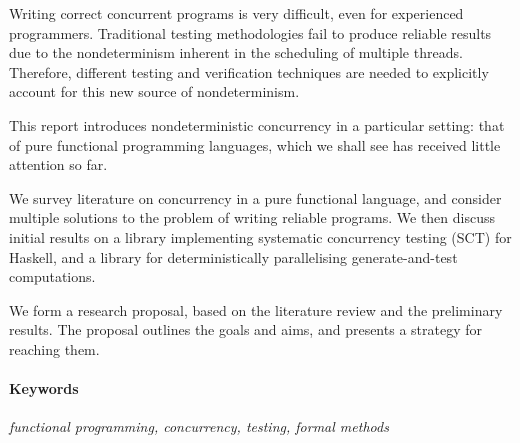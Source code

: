 
Writing correct concurrent programs is very difficult, even for
experienced programmers. Traditional testing methodologies fail to
produce reliable results due to the nondeterminism inherent in the
scheduling of multiple threads. Therefore, different testing and
verification techniques are needed to explicitly account for this new
source of nondeterminism.

This report introduces nondeterministic concurrency in a particular
setting: that of pure functional programming languages, which we shall
see has received little attention so far.

We survey literature on concurrency in a pure functional language, and
consider multiple solutions to the problem of writing reliable
programs. We then discuss initial results on a library implementing
systematic concurrency testing (SCT) for Haskell, and a library for
deterministically parallelising generate-and-test computations.

We form a research proposal, based on the literature review and the
preliminary results. The proposal outlines the goals and aims, and
presents a strategy for reaching them.

\vfill

\paragraph{Keywords}

\textit{functional programming, concurrency,
  testing, formal methods}
